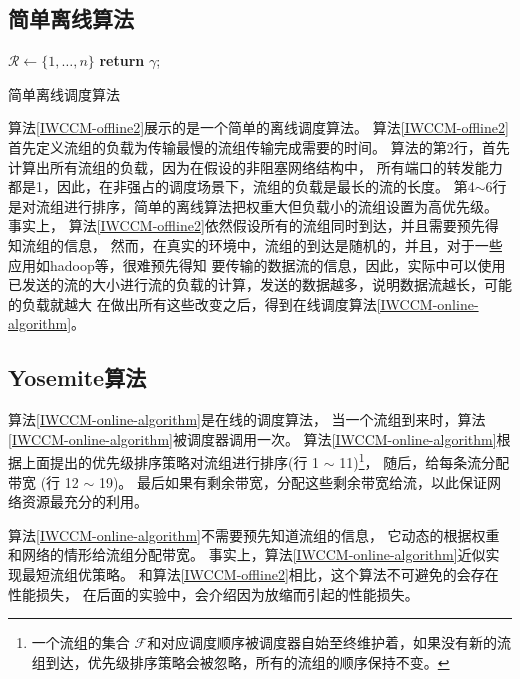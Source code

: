  \subsection{简单离线算法}
 \begin{algorithm}
$\mathcal{R} \gets \{1, \dots, n\}$\;
  \textbf{return} $\gamma$;
  \caption{简单离线调度算法}
  \label{IWCCM-offline2}
 \end{algorithm}
 
 
 算法\ref{IWCCM-offline2}展示的是一个简单的离线调度算法。
  算法\ref{IWCCM-offline2}首先定义流组的负载为传输最慢的流组传输完成需要的时间。
 算法的第2行，首先计算出所有流组的负载，因为在假设的非阻塞网络结构中，
 所有端口的转发能力都是1，因此，在非强占的调度场景下，流组的负载是最长的流的长度。
 第4$\sim$6行是对流组进行排序，简单的离线算法把权重大但负载小的流组设置为高优先级。
事实上， 算法\ref{IWCCM-offline2}依然假设所有的流组同时到达，并且需要预先得知流组的信息，
然而，在真实的环境中，流组的到达是随机的，并且，对于一些应用如hadoop等，很难预先得知
要传输的数据流的信息，因此，实际中可以使用已发送的流的大小进行流的负载的计算，发送的数据越多，说明数据流越长，可能的负载就越大
在做出所有这些改变之后，得到在线调度算法\ref {IWCCM-online-algorithm}。


\subsection{Yosemite算法}
 
 算法\ref {IWCCM-online-algorithm}是在线的调度算法，
当一个流组到来时，算法\ref {IWCCM-online-algorithm}被调度器调用一次。
算法\ref {IWCCM-online-algorithm}根据上面提出的优先级排序策略对流组进行排序(行 1 $\sim$ 11)\footnote{一个流组的集合 $\mathcal{F}$和对应调度顺序被调度器自始至终维护着，如果没有新的流组到达，优先级排序策略会被忽略，所有的流组的顺序保持不变。}，
随后，给每条流分配带宽 (行 12 $\sim$ 19)。
最后如果有剩余带宽，分配这些剩余带宽给流，以此保证网络资源最充分的利用。

算法\ref{IWCCM-online-algorithm}不需要预先知道流组的信息，
它动态的根据权重和网络的情形给流组分配带宽。
事实上，算法\ref{IWCCM-online-algorithm}近似实现最短流组优策略。
和算法\ref{IWCCM-offline2}相比，这个算法不可避免的会存在性能损失，
在后面的实验中，会介绍因为放缩而引起的性能损失。
 
